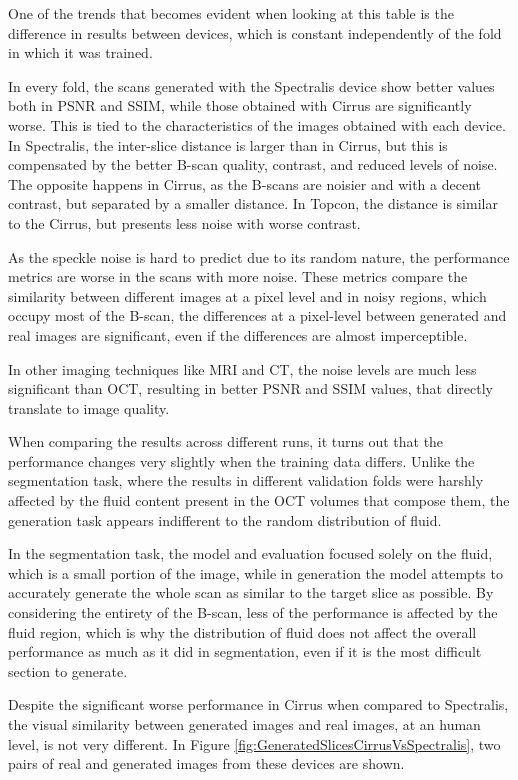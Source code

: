 One of the trends that becomes evident when looking at this table is the difference in results between devices, which is constant independently of the fold in which it was trained.
\par
In every fold, the scans generated with the Spectralis device show better values both in PSNR and SSIM, while those obtained with Cirrus are significantly worse. This is tied to the characteristics of the images obtained with each device. In Spectralis, the inter-slice distance is larger than in Cirrus, but this is compensated by the better B-scan quality, contrast, and reduced levels of noise. The opposite happens in Cirrus, as the B-scans are noisier and with a decent contrast, but separated by a smaller distance. In Topcon, the distance is similar to the Cirrus, but presents less noise with worse contrast. 
\par
As the speckle noise is hard to predict due to its random nature, the performance metrics are worse in the scans with more noise. These metrics compare the similarity between different images at a pixel level and in noisy regions, which occupy most of the B-scan, the differences at a pixel-level between generated and real images are significant, even if the differences are almost imperceptible.
\par
In other imaging techniques like MRI and CT, the noise levels are much less significant than OCT, resulting in better PSNR and SSIM values, that directly translate to image quality.
\par
When comparing the results across different runs, it turns out that the performance changes very slightly when the training data differs. Unlike the segmentation task, where the results in different validation folds were harshly affected by the fluid content present in the OCT volumes that compose them, the generation task appears indifferent to the random distribution of fluid.
\par
In the segmentation task, the model and evaluation focused solely on the fluid, which is a small portion of the image, while in generation the model attempts to accurately generate the whole scan as similar to the target slice as possible. By considering the entirety of the B-scan, less of the performance is affected by the fluid region, which is why the distribution of fluid does not affect the overall performance as much as it did in segmentation, even if it is the most difficult section to generate.
\par
Despite the significant worse performance in Cirrus when compared to Spectralis, the visual similarity between generated images and real images, at an human level, is not very different. In Figure \ref{fig:GeneratedSlicesCirrusVsSpectralis}, two pairs of real and generated images from these devices are shown.
